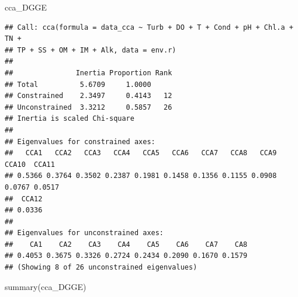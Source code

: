 \documentclass[
]{book}
\newenvironment{Shaded}{\begin{snugshade}}{\end{snugshade}}
\newcommand{\FunctionTok}[1]{\textcolor[rgb]{0.00,0.00,0.00}{#1}}
\newcommand{\NormalTok}[1]{#1}
\begin{document}
\begin{Shaded}
\begin{Highlighting}[]
\NormalTok{cca\_DGGE}
\end{Highlighting}
\end{Shaded}

\begin{verbatim}
## Call: cca(formula = data_cca ~ Turb + DO + T + Cond + pH + Chl.a + TN +
## TP + SS + OM + IM + Alk, data = env.r)
## 
##               Inertia Proportion Rank
## Total          5.6709     1.0000     
## Constrained    2.3497     0.4143   12
## Unconstrained  3.3212     0.5857   26
## Inertia is scaled Chi-square 
## 
## Eigenvalues for constrained axes:
##   CCA1   CCA2   CCA3   CCA4   CCA5   CCA6   CCA7   CCA8   CCA9  CCA10  CCA11 
## 0.5366 0.3764 0.3502 0.2387 0.1981 0.1458 0.1356 0.1155 0.0908 0.0767 0.0517 
##  CCA12 
## 0.0336 
## 
## Eigenvalues for unconstrained axes:
##    CA1    CA2    CA3    CA4    CA5    CA6    CA7    CA8 
## 0.4053 0.3675 0.3326 0.2724 0.2434 0.2090 0.1670 0.1579 
## (Showing 8 of 26 unconstrained eigenvalues)
\end{verbatim}

\begin{Shaded}
\begin{Highlighting}[]
\FunctionTok{summary}\NormalTok{(cca\_DGGE)}
\end{Highlighting}
\end{Shaded}
\end{document}
